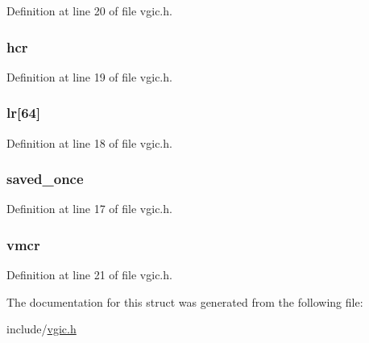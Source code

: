 \-Definition at line 20 of file vgic.\-h.

\hypertarget{structvgic__status_a1ee8df08f9e72db5f937da9b44749d82}{
\subsubsection[{hcr}]{ {\bf hcr}}}\label{structvgic__status_a1ee8df08f9e72db5f937da9b44749d82}


\-Definition at line 19 of file vgic.\-h.

\hypertarget{structvgic__status_a9727a41ead07f3e47db71be25eac72a8}{
\subsubsection[{lr}]{ {\bf lr}\mbox{[}64\mbox{]}}}\label{structvgic__status_a9727a41ead07f3e47db71be25eac72a8}


\-Definition at line 18 of file vgic.\-h.

\hypertarget{structvgic__status_a4dbccb447fcccf8637b1bdc671fe060b}{
\subsubsection[{saved\-\_\-once}]{ {\bf saved\-\_\-once}}}\label{structvgic__status_a4dbccb447fcccf8637b1bdc671fe060b}


\-Definition at line 17 of file vgic.\-h.

\hypertarget{structvgic__status_aa53861e93b1392d32bab7bac03ff47fc}{
\subsubsection[{vmcr}]{ {\bf vmcr}}}\label{structvgic__status_aa53861e93b1392d32bab7bac03ff47fc}


\-Definition at line 21 of file vgic.\-h.



\-The documentation for this struct was generated from the following file\-:\begin{DoxyCompactItemize}
\item 
include/\hyperlink{vgic_8h}{vgic.\-h}\end{DoxyCompactItemize}
